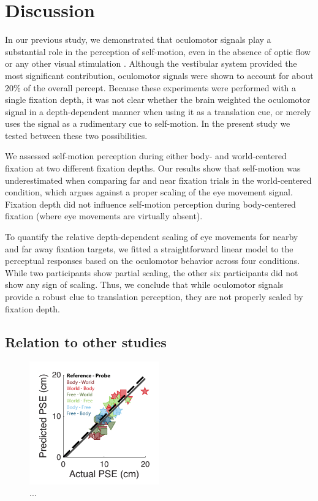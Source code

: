 \section{Discussion}

In our previous study, we demonstrated that oculomotor signals play a substantial role in the perception of self-motion, even in the absence of optic flow or any other visual stimulation \cite{clemens2015a}. Although the vestibular system provided the most significant contribution, oculomotor signals were shown to account for about 20\% of the overall percept. Because these experiments were performed with a single fixation depth, it was not clear whether the brain weighted the oculomotor signal in a depth-dependent manner when using it as a translation cue, or merely uses the signal as a rudimentary cue to self-motion. In the present study we tested between these two possibilities.

We assessed self-motion perception during either body- and world-centered fixation at two different fixation depths. Our results show that self-motion was underestimated when comparing far and near fixation trials in the world-centered condition, which argues against a proper scaling of the eye movement signal. Fixation depth did not influence self-motion perception during body-centered fixation (where eye movements are virtually absent).  

To quantify the relative depth-dependent scaling of eye movements for nearby and far away fixation targets, we fitted a straightforward linear model to the perceptual responses based on the oculomotor behavior across four conditions. While two participants show partial scaling, the other six participants did not show any sign of scaling. Thus, we conclude that while oculomotor signals provide a robust clue to translation perception, they are not properly scaled by fixation depth.


\subsection{Relation to other studies}

\begin{figure}
    \includegraphics[width=0.5\textwidth]{src/paper4/p4_figure6.pdf}

    \caption{...}
    \label{p4:fig6}
\end{figure}

